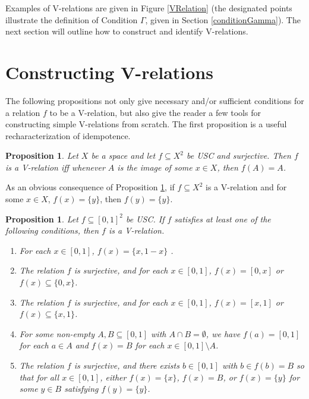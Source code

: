 \documentclass{article}
\theoremstyle{plain}
\newtheorem{proposition}[theorem]{Proposition}
\theoremstyle{definition}
\theoremstyle{remark}
\begin{document}
Examples of V-relations are given in Figure \ref{VRelation}
(the designated points illustrate the definition of Condition \(\Gamma\),
given in Section \ref{conditionGamma}).
The next section will outline how to construct and identify
V-relations.

\section{Constructing V-relations}

The following propositions not only give necessary and/or sufficient conditions 
for a relation \(f\) to be a V-relation, but also give the reader a few tools for 
constructing simple V-relations from scratch. The first proposition is a
useful recharacterization of idempotence.

\begin{proposition}\label{Vrelcondition}
Let $X$ be a space and let $f \subseteq X^2$ be USC and surjective. Then $f$ is a V-relation iff whenever $A$ is the image of some $x \in X$, then $f(A)=A$.
\end{proposition}

As an obvious consequence of Proposition \ref{Vrelcondition}, if $f \subseteq X^2$ 
is a V-relation and for some $x \in X$, $f(x)=\{y\}$, then $f(y)=\{y\}$.

\begin{proposition} \label{Vrelcondition2}
Let $f \subseteq [0,1]^2$ be USC. If $f$ satisfies at least one of the following conditions, then $f$ is a V-relation.

\begin{enumerate}
\item For each $x \in [0,1]$, $f(x)=\{x, 1-x\}$ .

\item The relation $f$ is surjective, and for each $x \in [0,1]$, $f(x)=[0,x]$ 
or $f(x) \subseteq \{0, x\}$.

\item
The relation $f$ is surjective, and for each $x \in [0,1]$, $f(x)=[x,1]$ or 
$f(x) \subseteq \{x,1\}$.

\item
For some non-empty $A, B \subseteq [0,1]$ with $A \cap B = \emptyset$, we have 
$f(a)=[0,1]$ for each $a \in A$ and $f(x)=B$ for each $x \in [0,1] \setminus A$.

\item  
The relation $f$ is surjective, and there exists $b\in [0,1]$ with 
$b\in f(b)=B$ so that for all $x \in [0,1]$, 
either $f(x)=\{x\}$, $f(x)=B$, or $f(x)=\{y\}$ for some $y\in B$ 
satisfying $f(y)=\{y\}$.
\end{enumerate}
\end{proposition}
\end{document}
